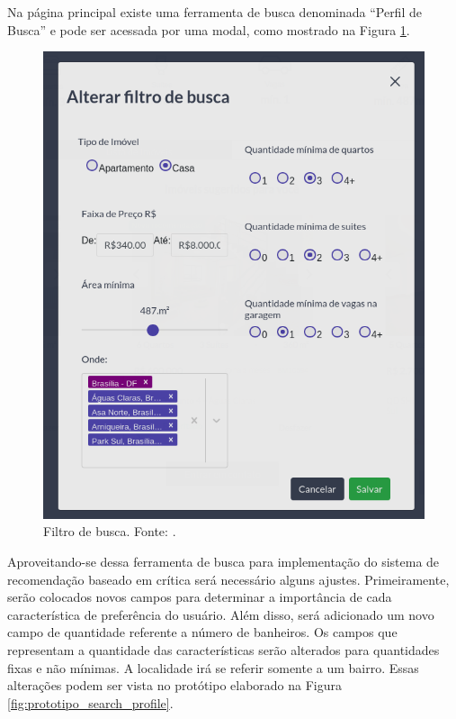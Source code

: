 Na página principal existe uma ferramenta de busca denominada “Perfil de Busca” e pode ser acessada por uma modal, como mostrado na Figura \ref{fig:filtro_busca}.

\begin{figure}[H]
    \centering
    \includegraphics[scale=0.6]{figuras/proposta/filtro_busca.png}
    \caption[Filtro de busca]{Filtro de busca. Fonte: \cite{Liva:2019}.}
    \label{fig:filtro_busca}
\end{figure}

Aproveitando-se dessa ferramenta de busca para implementação do sistema de recomendação baseado em crítica será necessário alguns ajustes. Primeiramente, serão colocados novos campos para determinar a importância de cada característica de preferência do usuário. Além disso, será adicionado um novo campo de quantidade referente a número de banheiros. Os campos que representam a quantidade das características serão alterados para quantidades fixas e não mínimas. A localidade irá se referir somente a um bairro. Essas alterações podem ser vista no protótipo elaborado na Figura \ref{fig:prototipo_search_profile}.

